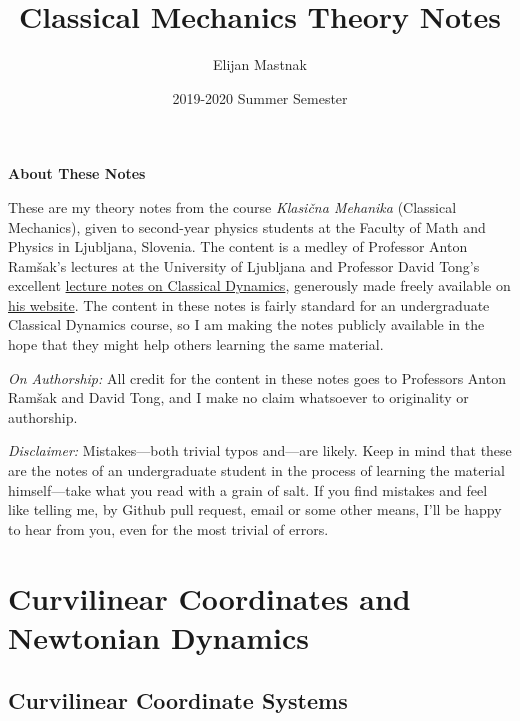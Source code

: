 \documentclass[11pt, a4paper]{article}
\begin{document}
\title{Classical Mechanics Theory Notes}
\author{Elijan Mastnak}
\date{2019-2020 Summer Semester}
\maketitle

\begin{center}
	\textbf{About These Notes}
\end{center}

These are my theory notes from the course \textit{Klasi\v{c}na Mehanika} (Classical Mechanics), given to second-year physics students at the Faculty of Math and Physics in Ljubljana, Slovenia. The content is a medley of Professor Anton Ram\v{s}ak's lectures at the University of Ljubljana and Professor David Tong's excellent \href{http://www.damtp.cam.ac.uk/user/tong/dynamics.html}{lecture notes on Classical Dynamics}, generously made freely available on \href{http://www.damtp.cam.ac.uk/user/tong/teaching.html}{his website}.  The content in these notes is fairly standard for an undergraduate Classical Dynamics course, so I am making the notes publicly available in the hope that they might help others learning the same material.

\vspace{2mm}
\textit{On Authorship:} All credit for the content in these notes goes to Professors Anton Ram\v{s}ak and David Tong, and I make no claim whatsoever to originality or authorship. 

\vspace{2mm}
\textit{Disclaimer:} Mistakes---both trivial typos and---are likely. Keep in mind that these are the notes of an undergraduate student in the process of learning the material himself---take what you read with a grain of salt. If you find mistakes and feel like telling me, by Github pull request, email or some other means, I'll be happy to hear from you, even for the most trivial of errors.


\tableofcontents

\newpage

\section{Curvilinear Coordinates and Newtonian Dynamics}

\subsection{Curvilinear Coordinate Systems}
\end{document}
